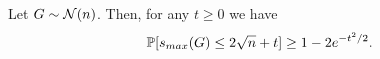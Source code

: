 \documentclass[10pt]{book}
\begin{document}
\begin{thm}
\label{rmt_smax_concen}
Let $G\sim\mathcal{N}(n)$. Then, for any $t\ge 0$ we have
\[
\mathbb{P}[s_{max}(G)\le 2\sqrt{n}+t]\ge 1-2e^{-t^2/2}.
\]
\end{thm}






\end{document}
